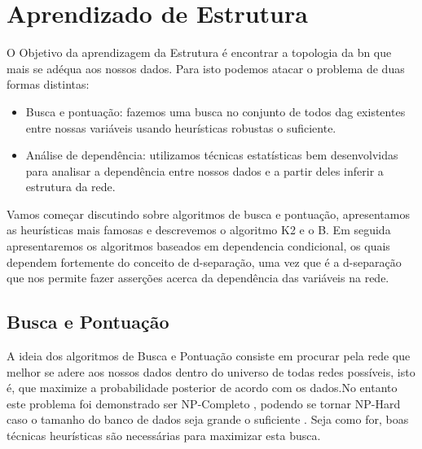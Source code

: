 \section{Aprendizado de Estrutura}
O Objetivo da aprendizagem da Estrutura é encontrar a topologia da \gls{bn} que mais se adéqua aos nossos dados. Para isto podemos atacar o problema de duas formas distintas:

\begin{itemize}
	\item Busca e pontuação: fazemos uma busca no conjunto de todos \gls{dag} existentes entre nossas variáveis usando heurísticas robustas o suficiente.
	\item Análise de dependência: utilizamos técnicas estatísticas bem desenvolvidas para analisar a dependência entre nossos dados e a partir deles inferir a estrutura da rede.
\end{itemize}


Vamos começar discutindo sobre algoritmos de busca e pontuação, apresentamos as heurísticas mais famosas e descrevemos o algoritmo K2 e o B. Em seguida apresentaremos os algoritmos baseados em dependencia condicional, os quais dependem fortemente do conceito de d-separação, uma vez que é a d-separação que nos permite fazer asserções acerca da dependência das variáveis na rede.

\subsection{Busca e Pontuação}
A ideia dos algoritmos de Busca e Pontuação consiste em procurar pela rede que melhor se adere aos nossos dados dentro do universo de todas redes possíveis, isto é, que maximize a probabilidade posterior de acordo com os dados.No entanto este problema foi demonstrado ser NP-Completo \cite{chickering96}, podendo se tornar NP-Hard caso o tamanho do banco de dados seja grande o suficiente \cite{chickering04}. Seja como for, boas técnicas heurísticas são necessárias para maximizar esta busca.

